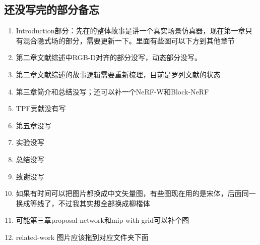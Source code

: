 %
%
%
%
%
%

\begin{appendices}
  \section{还没写完的部分备忘}
  \begin{enumerate}
      \item Introduction部分：先在的整体故事是讲一个真实场景仿真器，现在第一章只有混合隐式场的部分，需要更新一下。里面有些图可以下方到其他章节
      \item 第二章文献综述中RGB-D对齐的部分没写，动态部分没写。
      \item 第二章文献综述的故事逻辑需要重新梳理，目前是罗列文献的状态
      \item 第三章简介和总结没写；还可以补一个NeRF-W和Block-NeRF
      \item TPF贡献没有写
      \item 第五章没写
      \item 实验没写
      \item 总结没写
      \item 致谢没写
      \item 如果有时间可以把图片都换成中文矢量图，有些图现在用的是宋体，后面同一换成等线了，不过我其实想全部换成柳楷体
      \item 可能第三章proposal network和mip with grid可以补个图
      \item related-work 图片应该拖到对应文件夹下面
  \end{enumerate}

\end{appendices}

